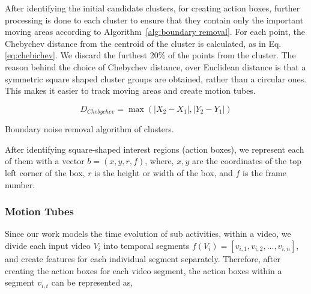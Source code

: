 After identifying the initial candidate clusters, for creating action boxes, further processing is done to each cluster to ensure that they
contain only the important moving areas according to Algorithm~\ref{alg:boundary removal}. For each point, the Chebychev distance from the centroid of the cluster is calculated,
as in
Eq. \ref{eq:chebichev}. We discard the furthest 20\% of the points from the cluster. The reason behind the choice of Chebychev
distance, over Euclidean distance is that a symmetric square shaped cluster groups are obtained, rather than a circular ones. This makes it
easier to track moving areas and create motion tubes.

\begin{equation}\label{eq:chebichev}
 D_{Chebychev} = \max(|X_{2} - X_{1}|,|Y_{2}-Y_{1}|)
\end{equation}

\begin{algorithm*}
   \caption{Boundary noise removal algorithm of clusters.}
   \label{alg:boundary removal}
    \begin{algorithmic}[1]
	  \EndIf
	
	\EndWhile
     \EndFunction


\end{algorithmic}
\end{algorithm*}

After identifying square-shaped interest regions (action boxes), we represent each of them with a vector $b = (x,y,r,f)$, where, $x,y$ are the coordinates
of the top left corner of the box, $r$ is the height or width of the box, and $f$ is the frame number.


\subsubsection{Motion Tubes}
Since our work models the time evolution of sub activities, within a video, we divide each input video $V_{i}$ into temporal segments $f(V_{i}) = [v_{i,1},
v_{i,2}, \dots, v_{i,n}]$,
and create features for each individual segment separately. Therefore, after creating the action boxes for each video segment,
the action boxes within a segment $v_{i,t}$ can be represented as,

